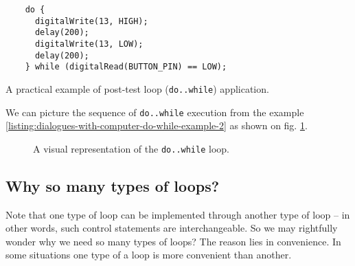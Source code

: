 \documentclass[../sparc.tex]{subfiles}
\begin{document}
\begin{listing}[ht]
  \begin{verbatim}
    do {
      digitalWrite(13, HIGH);
      delay(200);
      digitalWrite(13, LOW);
      delay(200);
    } while (digitalRead(BUTTON_PIN) == LOW);
  \end{verbatim}
  \label{listing:dialogues-with-computer-do-while-example-2}
  \caption{A practical example of post-test loop (\texttt{do..while})
    application.}
\end{listing}

We can picture the sequence of \texttt{do..while} execution from the example
\ref{listing:dialogues-with-computer-do-while-example-2} as shown on fig.
\ref{fig:control-flow-do-while-loop}.

\begin{figure}[ht]
  \centering
  \label{fig:control-flow-do-while-loop}
  \caption{A visual representation of the \texttt{do..while} loop.}
\end{figure}

\subsection{Why so many types of loops?}

Note that one type of loop can be implemented through another type of loop -- in
other words, such control statements are interchangeable.  So we may rightfully
wonder why we need so many types of loops?  The reason lies in convenience.  In
some situations one type of a loop is more convenient than another.
\end{document}
